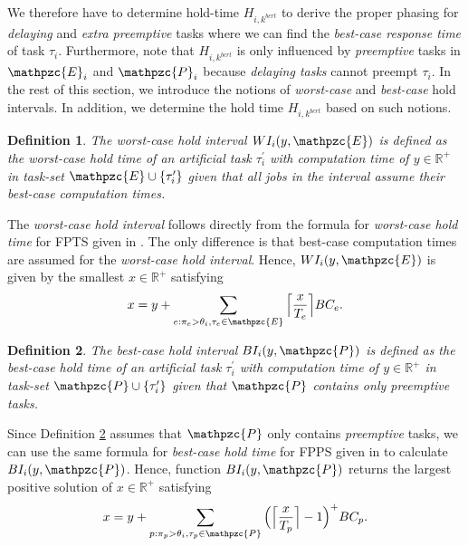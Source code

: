 \documentclass[fleqn]{article}
\newtheorem{definition}{Definition}
\begin{document}
We therefore have to determine hold-time $H_{i,k^{bcrt}}$ to derive the proper phasing for \textit{delaying} and \textit{extra preemptive} tasks where we can find the \textit{best-case response time} of task $\tau_i$. Furthermore, note that $H_{i,k^{bcrt}}$ is only influenced by \textit{preemptive} tasks in $\mathpzc{E}_i$ and $\mathpzc{P}_i$ because \textit{delaying tasks} cannot preempt $\tau_i$. In the rest of this section, we introduce the notions of \textit{worst-case} and \textit{best-case} hold intervals. In addition, we determine the hold time $H_{i,k^{bcrt}}$ based on such notions.

\begin{definition}
	The \textit{worst-case hold interval} $WI_i(y,\mathpzc{E})$ is defined as the worst-case hold time of an artificial task $\tau^{\prime}_i$ with computation time of $y \in \mathbb{R}^+$ in task-set $\mathpzc{E}\cup \{\tau^{\prime}_i\}$ given that all jobs in the interval assume their \textit{best-case computation times}.
\end{definition}

The \textit{worst-case hold interval} follows directly from the formula for \textit{worst-case hold time} for FPTS given in \cite{BAHDB17}. The only difference is that best-case computation times are assumed for the \textit{worst-case hold interval}. Hence, $WI_i(y,\mathpzc{E})$ is given by the smallest $x \in \mathbb{R}^+$ satisfying
\begin{align}
x = y + \sum\limits_{e:\pi_e > \theta_i, \tau_e \in \mathpzc{E}}\Big\lceil  \dfrac{x}{T_e}\Big\rceil  BC_e.
\end{align}

\begin{definition} \label{def:best_case_interval}
	The \textit{best-case hold interval} $BI_i(y,\mathpzc{P})$ is defined as the best-case hold time of an artificial task $\tau^{\prime}_i$ with computation time of $y \in \mathbb{R}^+$ in task-set $\mathpzc{P}\cup \{\tau^{\prime}_i\}$ given that $\mathpzc{P}$ contains only preemptive tasks.
	
\end{definition}

Since Definition \ref{def:best_case_interval} assumes that $\mathpzc{P}$ only contains \textit{preemptive} tasks, we can use the same formula for\textit{ best-case hold time} for FPPS given in \cite{BFV08} to calculate $BI_i(y,\mathpzc{P})$. Hence, function $BI_i(y,\mathpzc{P})$ returns the largest positive solution of $x \in \mathbb{R}^+$ satisfying
\begin{align}
x = y + \sum\limits_{p:\pi_p > \theta_i, \tau_p \in \mathpzc{P}} \Big( \Big\lceil  \dfrac{x}{T_p}\Big\rceil -1 \Big)^+  BC_p.
\end{align}
\end{document}
